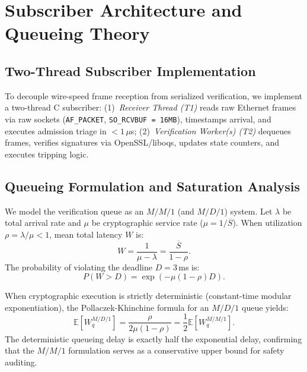 \documentclass[journal]{IEEEtran}
\begin{document}
\section{Subscriber Architecture and Queueing Theory}
\label{sec:architecture_queueing}

\subsection{Two-Thread Subscriber Implementation}
To decouple wire-speed frame reception from serialized verification, we implement a two-thread C subscriber: (1)~\emph{Receiver Thread (T1)} reads raw Ethernet frames via raw sockets (\texttt{AF\_PACKET}, \texttt{SO\_RCVBUF = 16MB}), timestamps arrival, and executes admission triage in $<1\,\mu$s; (2)~\emph{Verification Worker(s) (T2)} dequeues frames, verifies signatures via OpenSSL/liboqs, updates state counters, and executes tripping logic.

\subsection{Queueing Formulation and Saturation Analysis}
We model the verification queue as an $M/M/1$ (and $M/D/1$) system. Let $\lambda$ be total arrival rate and $\mu$ be cryptographic service rate ($\mu = 1/\overline{S}$). When utilization $\rho = \lambda/\mu < 1$, mean total latency $W$ is:
\begin{equation}
W = \frac{1}{\mu - \lambda} = \frac{\overline{S}}{1 - \rho}.
\end{equation}
The probability of violating the deadline $D = 3$\,ms is:
\begin{equation}
P(W > D) = \exp\left(-\mu(1 - \rho) D\right).
\end{equation}

When cryptographic execution is strictly deterministic (constant-time modular exponentiation), the Pollaczek-Khinchine formula for an $M/D/1$ queue yields:
\begin{equation}
\mathbb{E}[W_q^{M/D/1}] = \frac{\rho}{2\mu(1-\rho)} = \frac{1}{2} \mathbb{E}[W_q^{M/M/1}].
\end{equation}
The deterministic queueing delay is exactly half the exponential delay, confirming that the $M/M/1$ formulation serves as a conservative upper bound for safety auditing.
\end{document}
